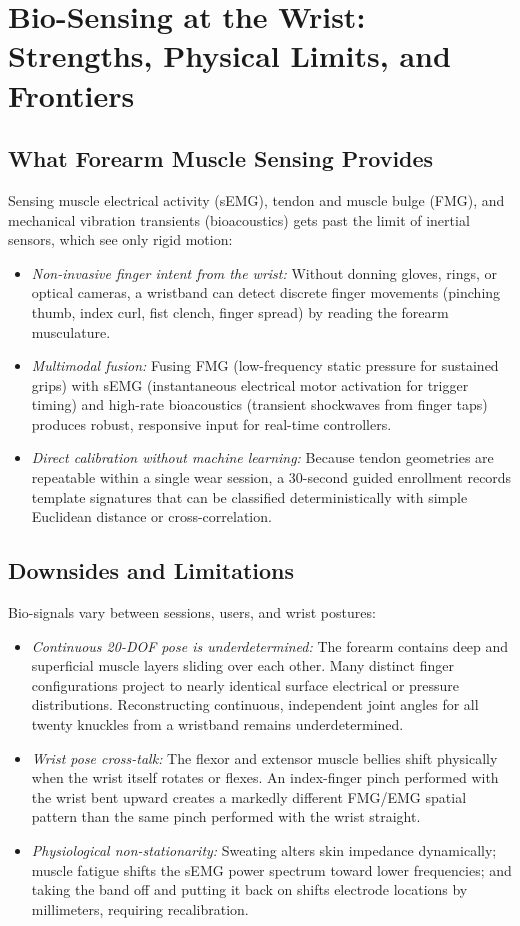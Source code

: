 \section{Bio-Sensing at the Wrist: Strengths, Physical Limits, and Frontiers}
\label{ch37:capabilities-limits}

\subsection{What Forearm Muscle Sensing Provides}
Sensing muscle electrical activity (sEMG), tendon and muscle bulge (FMG), and mechanical vibration transients (bioacoustics) gets past the limit of inertial sensors, which see only rigid motion:
\begin{itemize}
  \item \emph{Non-invasive finger intent from the wrist:} Without donning gloves, rings, or optical cameras, a wristband can detect discrete finger movements (pinching thumb, index curl, fist clench, finger spread) by reading the forearm musculature.
  \item \emph{Multimodal fusion:} Fusing FMG (low-frequency static pressure for sustained grips) with sEMG (instantaneous electrical motor activation for trigger timing) and high-rate bioacoustics (transient shockwaves from finger taps) produces robust, responsive input for real-time controllers.
  \item \emph{Direct calibration without machine learning:} Because tendon geometries are repeatable within a single wear session, a 30-second guided enrollment records template signatures that can be classified deterministically with simple Euclidean distance or cross-correlation.
\end{itemize}

\subsection{Downsides and Limitations}
Bio-signals vary between sessions, users, and wrist postures:
\begin{itemize}
  \item \emph{Continuous 20-DOF pose is underdetermined:} The forearm contains deep and superficial muscle layers sliding over each other. Many distinct finger configurations project to nearly identical surface electrical or pressure distributions. Reconstructing continuous, independent joint angles for all twenty knuckles from a wristband remains underdetermined.
  \item \emph{Wrist pose cross-talk:} The flexor and extensor muscle bellies shift physically when the wrist itself rotates or flexes. An index-finger pinch performed with the wrist bent upward creates a markedly different FMG/EMG spatial pattern than the same pinch performed with the wrist straight.
  \item \emph{Physiological non-stationarity:} Sweating alters skin impedance dynamically; muscle fatigue shifts the sEMG power spectrum toward lower frequencies; and taking the band off and putting it back on shifts electrode locations by millimeters, requiring recalibration.
\end{itemize}


